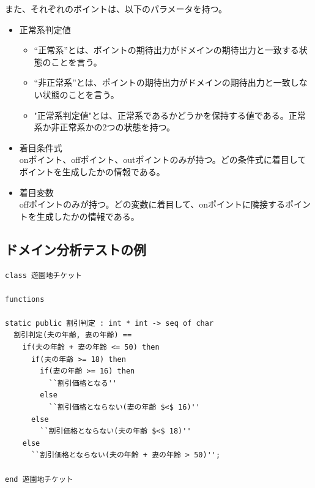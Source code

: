 \documentclass[uplatex, report, a4j, 10pt]{jsbook}
\begin{document}
また、それぞれのポイントは、以下のパラメータを持つ。
\begin{itemize}
  \item 正常系判定値
        \begin{itemize}
          \item “正常系”とは、ポイントの期待出力がドメインの期待出力と一致する状態のことを言う。
          \item “非正常系”とは、ポイントの期待出力がドメインの期待出力と一致しない状態のことを言う。
          \item "正常系判定値"とは、正常系であるかどうかを保持する値である。正常系か非正常系かの2つの状態を持つ。
        \end{itemize}
  \item 着目条件式\\
        onポイント、offポイント、outポイントのみが持つ。どの条件式に着目してポイントを生成したかの情報である。
  \item 着目変数\\
        offポイントのみが持つ。どの変数に着目して、onポイントに隣接するポイントを生成したかの情報である。
\end{itemize}

\subsection{ドメイン分析テストの例}
\lstset{language=}
\noindent\begin{minipage}{\textwidth}
  \begin{lstlisting}[caption=ドメインテストが必要となる仕様(遊園地チケット割引機能),label=fig:vdm_park]
class 遊園地チケット

functions

static public 割引判定 : int * int -> seq of char
  割引判定(夫の年齢, 妻の年齢) ==
    if(夫の年齢 + 妻の年齢 <= 50) then
      if(夫の年齢 >= 18) then
        if(妻の年齢 >= 16) then
          ``割引価格となる''
        else
          ``割引価格とならない(妻の年齢 $<$ 16)''
      else
        ``割引価格とならない(夫の年齢 $<$ 18)''
    else
      ``割引価格とならない(夫の年齢 + 妻の年齢 > 50)'';

end 遊園地チケット
\end{lstlisting}
\end{minipage}
\end{document}
